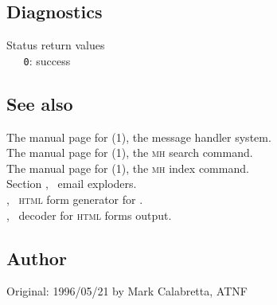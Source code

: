\subsection*{Diagnostics}

Status return values
\\ \verb+   0+: success

\subsection*{See also}

The manual page for (1), the message handler system.\\
The manual page for (1), the \textsc{mh} search command.\\
The manual page for (1), the \textsc{mh} index command.\\
Section , \aipspp\ email exploders.\\
, \aipspp\ \textsc{html} form generator for .\\
, \aipspp\ decoder for \textsc{html} forms output.

\subsection*{Author}

Original: 1996/05/21 by Mark Calabretta, ATNF
